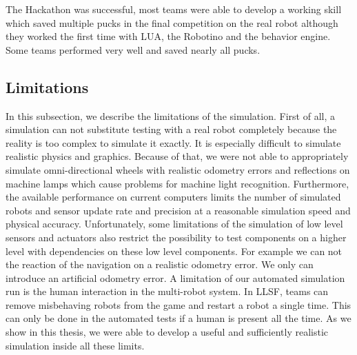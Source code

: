 The Hackathon was successful, most teams were able to develop a working skill which saved multiple pucks in the final competition on the real robot although they worked the first time with LUA, the Robotino and the behavior engine. Some teams performed very well and saved nearly all pucks.

\subsection{Limitations}
In this subsection, we describe the limitations of the simulation. First of all, a simulation can not substitute testing with a real robot completely because the reality is too complex to simulate it exactly. It is especially difficult to simulate realistic physics and graphics. Because of that, we were not able to appropriately simulate omni-directional wheels with realistic odometry errors and reflections on machine lamps which cause problems for machine light recognition. Furthermore, the available performance on current computers limits the number of simulated robots and sensor update rate and precision at a reasonable simulation speed and physical accuracy. Unfortunately, some limitations of the simulation of low level sensors and actuators also restrict the possibility to test components on a higher level with dependencies on these low level components. For example we can not the reaction of the navigation on a realistic odometry error. We only can introduce an artificial odometry error. A limitation of our automated simulation run is the human interaction in the multi-robot system. In LLSF, teams can remove misbehaving robots from the game and restart a robot a single time. This can only be done in the automated tests if a human is present all the time. As we show in this thesis, we were able to develop a useful and sufficiently realistic simulation inside all these limits.\\

